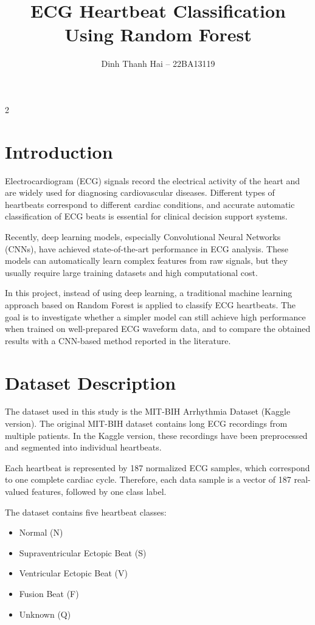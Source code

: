 \documentclass[a4paper,10pt]{article}
\title{ECG Heartbeat Classification Using Random Forest}
\author{Dinh Thanh Hai -- 22BA13119}
\date{}
\begin{document}
\maketitle

\begin{multicols}{2}

\section{Introduction}

Electrocardiogram (ECG) signals record the electrical activity of the heart and are widely used for diagnosing cardiovascular diseases. Different types of heartbeats correspond to different cardiac conditions, and accurate automatic classification of ECG beats is essential for clinical decision support systems.

Recently, deep learning models, especially Convolutional Neural Networks (CNNs), have achieved state-of-the-art performance in ECG analysis. These models can automatically learn complex features from raw signals, but they usually require large training datasets and high computational cost.

In this project, instead of using deep learning, a traditional machine learning approach based on Random Forest is applied to classify ECG heartbeats. The goal is to investigate whether a simpler model can still achieve high performance when trained on well-prepared ECG waveform data, and to compare the obtained results with a CNN-based method reported in the literature.

\section{Dataset Description}

The dataset used in this study is the MIT-BIH Arrhythmia Dataset (Kaggle version). The original MIT-BIH dataset contains long ECG recordings from multiple patients. In the Kaggle version, these recordings have been preprocessed and segmented into individual heartbeats.

Each heartbeat is represented by 187 normalized ECG samples, which correspond to one complete cardiac cycle. Therefore, each data sample is a vector of 187 real-valued features, followed by one class label.

The dataset contains five heartbeat classes:
\begin{itemize}
    \item Normal (N)
    \item Supraventricular Ectopic Beat (S)
    \item Ventricular Ectopic Beat (V)
    \item Fusion Beat (F)
    \item Unknown (Q)
\end{itemize}


\end{multicols}
\end{document}
